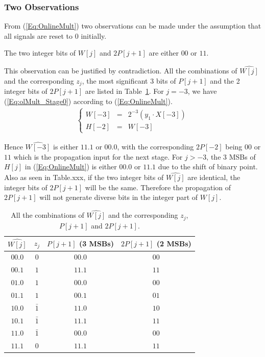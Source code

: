 \documentclass[a4paper, 11pt]{article}
\newtheorem{Ob}{\hskip\parindent\bf{Observation}}[]
\begin{document}
\subsubsection{Two Observations}
From (\ref{Eq:OnlineMult}) two observations can be made under the assumption that all signals are reset to $0$ initially.

\begin{Ob}\label{Ob:Ob1}
    The two integer bits of $W[j]$ and $2P[j+1]$ are either $00$ or $11$.
\end{Ob}

This observation can be justified by contradiction. All the combinations of $\widehat{W[j]}$ and the corresponding $z_j$, the most significant 3 bits of $P[j+1]$ and the 2 integer bits of $2P[j+1]$ are listed in Table~\ref{Tab:Observation1}. For $j=-3$, we have (\ref{Eq:olMult_Stage0}) according to (\ref{Eq:OnlineMult}).
\begin{eqnarray}\label{Eq:olMult_Stage0}
\left\{\begin{matrix}
    W[-3] & = & 2^{-3}(y_1\cdot X[-3])\\
    H[-2] & = & W[-3]
\end{matrix}\right.
\end{eqnarray}

Hence $\widehat{W[-3]}$ is either $11.1$ or $00.0$, with the corresponding $2P[-2]$ being $00$ or $11$ which is the propagation input for the next stage. For $j>-3$, the 3 MSBs of $H[j]$ in (\ref{Eq:OnlineMult}) is either $00.0$ or $11.1$ due to the shift of binary point. Also as seen in Table.xxx, if the two integer bits of $\widehat{W[j]}$ are identical, the integer bits of $2P[j+1]$ will be the same. Therefore the propagation of $2P[j+1]$ will not generate diverse bits in the integer part of $W[j]$.
%
\begin{table}[htbp]
\caption{All the combinations of $\widehat{W[j]}$ and the corresponding $z_j$, $P[j+1]$ and $2P[j+1]$.}
\centering
\begin{tabular}{c|ccc}
\toprule
 $\widehat{W[j]}$ & $z_j$ & $P[j+1]$ (3 MSBs)  & $2P[j+1]$ (2 MSBs) \\ \midrule
 $00.0$ & $0$ & $00.0$ & $00$\\
 $00.1$ & $1$ & $11.1$ & $11$\\
 $01.0$ & $1$ & $00.0$ & $00$\\
 $01.1$ & $1$ & $00.1$ & $01$\\
 $10.0$ & $\bar{1}$ & $11.0$ & $10$\\
 $10.1$ & $\bar{1}$ & $11.1$ & $11$\\
 $11.0$ & $\bar{1}$ & $00.0$ & $00$\\
 $11.1$ & $0$ & $11.1$ & $11$\\ \bottomrule
\end{tabular}
\label{Tab:Observation1}
\end{table}
\end{document}
